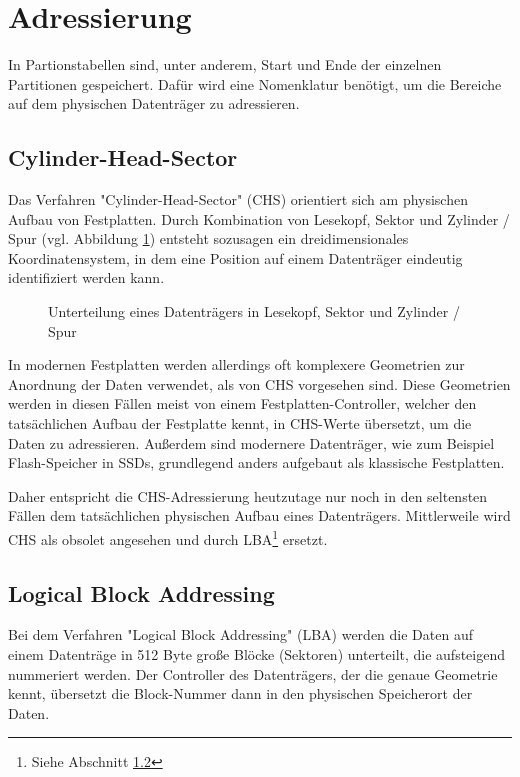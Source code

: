 \section{Adressierung}
In Partionstabellen sind, unter anderem, Start und Ende der einzelnen Partitionen gespeichert.
Dafür wird eine Nomenklatur benötigt, um die Bereiche auf dem physischen Datenträger zu adressieren.

\subsection{Cylinder-Head-Sector}
Das Verfahren "Cylinder-Head-Sector" (CHS) orientiert sich am physischen Aufbau von Festplatten.
Durch Kombination von Lesekopf, Sektor und Zylinder / Spur (vgl. Abbildung \ref{fig:chs}) entsteht sozusagen ein dreidimensionales Koordinatensystem, in dem eine Position auf einem Datenträger eindeutig identifiziert werden kann.

\begin{figure}[ht]
    \centering
    \fbox{}
    \caption{Unterteilung eines Datenträgers in Lesekopf, Sektor und Zylinder / Spur}
    \label{fig:chs}
\end{figure}

In modernen Festplatten werden allerdings oft komplexere Geometrien zur Anordnung der Daten verwendet, als von CHS vorgesehen sind.
Diese Geometrien werden in diesen Fällen meist von einem Festplatten-Controller, welcher den tatsächlichen Aufbau der Festplatte kennt, in CHS-Werte übersetzt, um die Daten zu adressieren.\cite{pollard2011}
Außerdem sind modernere Datenträger, wie zum Beispiel Flash-Speicher in SSDs, grundlegend anders aufgebaut als klassische Festplatten.

Daher entspricht die CHS-Adressierung heutzutage nur noch in den seltensten Fällen dem tatsächlichen physischen Aufbau eines Datenträgers. 
Mittlerweile wird CHS als obsolet angesehen und durch LBA\footnote{Siehe Abschnitt \ref{sec:LBA}} ersetzt.


\subsection{Logical Block Addressing}
\label{sec:LBA}
Bei dem Verfahren "Logical Block Addressing" (LBA) werden die Daten auf einem Datenträge in 512 Byte große Blöcke (Sektoren) unterteilt, die aufsteigend nummeriert werden.
Der Controller des Datenträgers, der die genaue Geometrie kennt, übersetzt die Block-Nummer dann in den physischen Speicherort der Daten.
